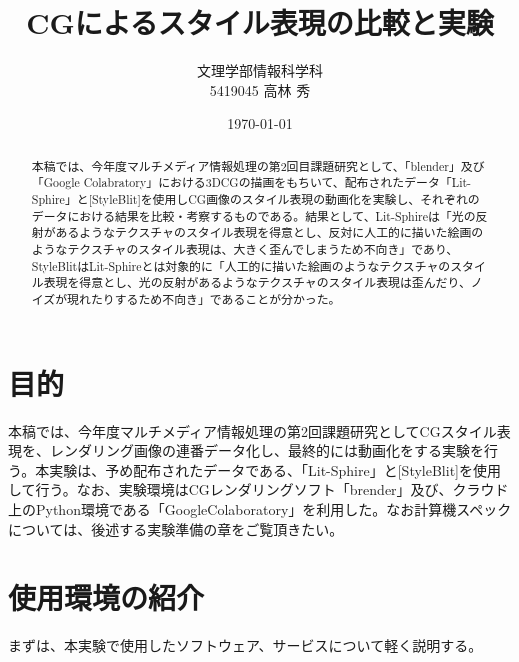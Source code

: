 \documentclass[dvipdfmx]{jsarticle}
\title{CGによるスタイル表現の比較と実験}
\author{文理学部情報科学科\\5419045 高林 秀}
\date{\today}
\begin{document}
\maketitle

\begin{abstract}
  本稿では、今年度マルチメディア情報処理の第2回目課題研究として、「blender」及び「Google Colabratory」における3DCGの描画をもちいて、配布されたデータ「Lit-Sphire」と[StyleBlit]を使用しCG画像のスタイル表現の動画化を実験し、それぞれのデータにおける結果を比較・考察するものである。結果として、Lit-Sphireは「光の反射があるようなテクスチャのスタイル表現を得意とし、反対に人工的に描いた絵画のようなテクスチャのスタイル表現は、大きく歪んでしまうため不向き」であり、StyleBlitはLit-Sphireとは対象的に「人工的に描いた絵画のようなテクスチャのスタイル表現を得意とし、光の反射があるようなテクスチャのスタイル表現は歪んだり、ノイズが現れたりするため不向き」であることが分かった。
\end{abstract}

\section{目的}
本稿では、今年度マルチメディア情報処理の第2回課題研究としてCGスタイル表現を、レンダリング画像の連番データ化し、最終的には動画化をする実験を行う。本実験は、予め配布されたデータである、「Lit-Sphire」と[StyleBlit]を使用して行う。なお、実験環境はCGレンダリングソフト「brender」及び、クラウド上のPython環境である「GoogleColaboratory」を利用した。なお計算機スペックについては、後述する実験準備の章をご覧頂きたい。
\section{使用環境の紹介}
まずは、本実験で使用したソフトウェア、サービスについて軽く説明する。
\end{document}
